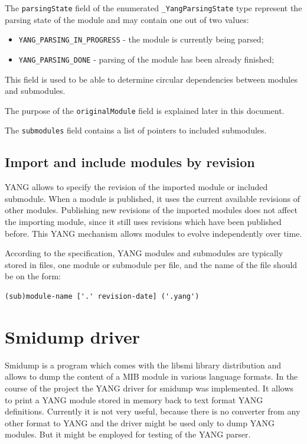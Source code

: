 \documentclass[conference]{IEEEtran}
\begin{document}
The \texttt{parsingState} field of the enumerated \texttt{\_YangParsingState} type represent the parsing state of the module and may contain one out of two values:
\begin{itemize}
\item \texttt{YANG\_PARSING\_IN\_PROGRESS} - the module is currently being parsed;
\item \texttt{YANG\_PARSING\_DONE} - parsing of the module has been already finished;
\end{itemize}
This field is used to be able to determine circular dependencies between modules and submodules.

The purpose of the \texttt{originalModule} field is explained later in this document.

The \texttt{submodules} field contains a list of pointers to included submodules. 

\subsection{Import and include modules by revision}
YANG allows to specify the revision of the imported module or included submodule. When a module is published, it uses the current available revisions of other modules. Publishing new revisions of the imported modules  does not affect the importing module, since it still uses revisions which have been published before. This YANG mechanism allows modules to evolve independently over time. 

According to the specification, YANG modules and submodules are typically stored in files, one module or submodule per file, and the name of the file should be on the form:
\small
\begin{verbatim}
(sub)module-name ['.' revision-date] ('.yang')
\end{verbatim}
\normalsize

\section{Smidump driver}
Smidump is a program which comes with the libsmi library distribution and allows to dump the content of a MIB module in various language formats. In the course of the project the YANG driver for smidump was implemented. It allows to print a YANG module stored in memory back to text format YANG definitions. Currently it is not very useful, because there is no converter from any other format to YANG and the driver might be used only to dump YANG modules. But it might be employed for testing of the YANG parser.
\end{document}
